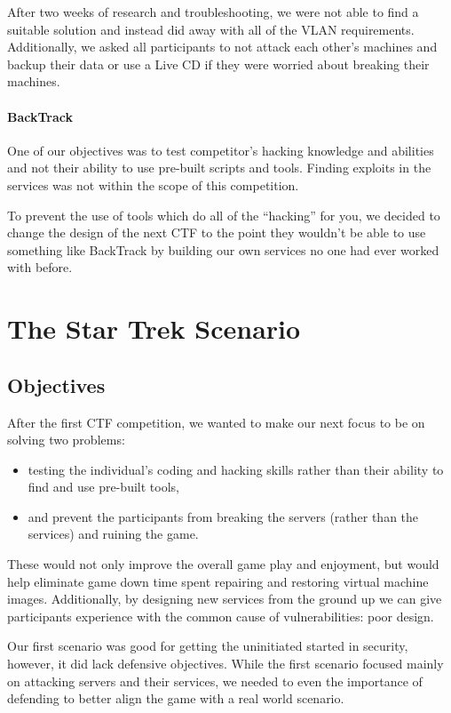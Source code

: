 \documentclass[10pt]{article}
\begin{document}
After two weeks of research and troubleshooting, we were not able to find a
suitable solution and instead did away with all of the VLAN requirements.
Additionally, we asked all participants to not attack each other's machines and
backup their data or use a Live CD if they were worried about breaking their
machines.

\paragraph*{BackTrack} One of our objectives was to test competitor's hacking
knowledge and abilities and not their ability to use pre-built scripts and
tools. Finding exploits in the services was not within the scope of this
competition. 

To prevent the use of tools which do all of the ``hacking'' for you, we decided
to change the design of the next CTF to the point they wouldn't be able to use
something like BackTrack by building our own services no one had ever worked
with before. 

\section{The Star Trek Scenario}
\label{stscenario}
\subsection{Objectives}
After the first CTF competition, we wanted to make our next focus to be on
solving two problems:
\begin{itemize}
	\item testing the individual's coding and hacking skills rather than their
	ability to find and use pre-built tools,
	\item and prevent the participants from breaking the servers (rather than the
	services) and ruining the game.
\end{itemize}

These would not only improve the overall game play and enjoyment, but would
help eliminate game down time spent repairing and restoring virtual machine
images. Additionally, by designing new services from the ground up we can
give participants experience with the common cause of vulnerabilities: poor
design.

Our first scenario was good for getting the uninitiated started in security,
however, it did lack defensive objectives. While the first scenario focused
mainly on attacking servers and their services, we needed to even the importance
of defending to better align the game with a real world scenario.
\end{document}
